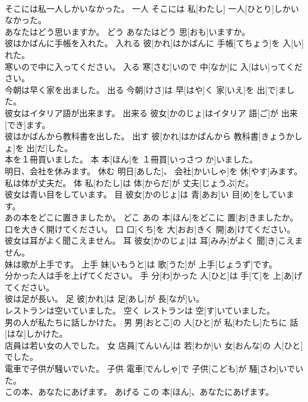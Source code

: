 \documentclass[8pt]{extreport}
\begin{document}
\begin{CJK}{UTF8}{min}
\\	そこには私一人しかいなかった。	一人	そこには 私[わたし] 一人[ひとり]しかいなかった。	
\\	あなたはどう思いますか。	どう	あなたはどう 思[おも]いますか。	
\\	彼はかばんに手帳を入れた。	入れる	彼[かれ]はかばんに 手帳[てちょう]を 入[い]れた。	
\\	寒いので中に入ってください。	入る	寒[さむ]いので 中[なか]に 入[はい]ってください。	
\\	今朝は早く家を出ました。	出る	今朝[けさ]は 早[はや]く 家[いえ]を 出[で]ました。	
\\	彼女はイタリア語が出来ます。	出来る	彼女[かのじょ]はイタリア 語[ご]が 出来[でき]ます。	
\\	彼はかばんから教科書を出した。	出す	彼[かれ]はかばんから 教科書[きょうかしょ]を 出[だ]した。	
\\	本を１冊買いました。	本	本[ほん]を １冊買[いっさつ か]いました。	
\\	明日、会社を休みます。	休む	明日[あした]、 会社[かいしゃ]を 休[やす]みます。	
\\	私は体が丈夫だ。	体	私[わたし]は 体[からだ]が 丈夫[じょうぶ]だ。	
\\	彼女は青い目をしています。	目	彼女[かのじょ]は 青[あお]い 目[め]をしています。	
\\	あの本をどこに置きましたか。	どこ	あの 本[ほん]をどこに 置[お]きましたか。	
\\	口を大きく開けてください。	口	口[くち]を 大[おお]きく 開[あ]けてください。	
\\	彼女は耳がよく聞こえません。	耳	彼女[かのじょ]は 耳[みみ]がよく 聞[き]こえません。	
\\	妹は歌が上手です。	上手	妹[いもうと]は 歌[うた]が 上手[じょうず]です。	
\\	分かった人は手を上げてください。	手	分[わ]かった 人[ひと]は 手[て]を 上[あ]げてください。	
\\	彼は足が長い。	足	彼[かれ]は 足[あし]が 長[なが]い。	
\\	レストランは空いていました。	空く	レストランは 空[す]いていました。	
\\	男の人が私たちに話しかけた。	男	男[おとこ]の 人[ひと]が 私[わたし]たちに 話[はな]しかけた。	
\\	店員は若い女の人でした。	女	店員[てんいん]は 若[わか]い 女[おんな]の 人[ひと]でした。	
\\	電車で子供が騒いでいた。	子供	電車[でんしゃ]で 子供[こども]が 騒[さわ]いでいた。	
\\	この本、あなたにあげます。	あげる	この 本[ほん]、あなたにあげます。	

\end{CJK}
\end{document}
